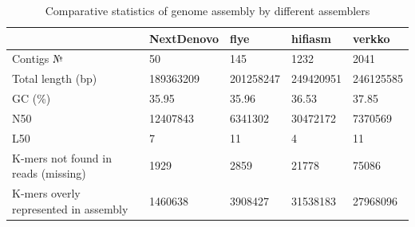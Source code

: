 \documentclass[9pt,twocolumn,twoside,lineno]{gsag3jnl}
\begin{document}
\begin{table}[p]
\centering
\caption{Comparative statistics of genome assembly by different assemblers}
\begin{tableminipage}{\textwidth}
\begin{tabularx}{\textwidth}{@{}XXXXX@{}}
\hline
\textbf{}                             & \textbf{NextDenovo}                                   & \textbf{flye}                                         & \textbf{hifiasm}                                      & \textbf{verkko}                                       \\
\hline
Contigs №                             & 50                                                    & 145                                                   & 1232                                                  & 2041                                                  \\
Total length (bp)                     & 189363209                                             & 201258247                                             & 249420951                                             & 246125585                                             \\
GC (\%)                               & 35.95                                                 & 35.96                                                 & 36.53                                                 & 37.85                                                 \\
N50                                   & 12407843                                              & 6341302                                               & 30472172                                              & 7370569                                               \\
L50                                   & 7                                                     & 11                                                    & 4                                                     & 11                                                    \\
K-mers not found in reads (missing)   & 1929                                                  & 2859                                                  & 21778                                                 & 75086                                                 \\
K-mers overly represented in assembly & 1460638                                               & 3908427                                               & 31538183                                              & 27968096                                              \\

\end{tabularx}
\end{tableminipage}
\end{table}
\end{document}
